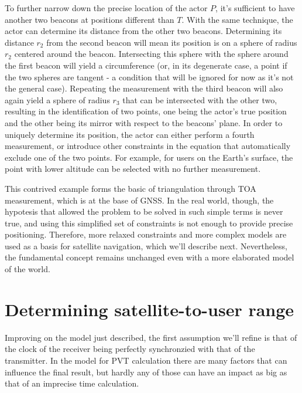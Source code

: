 To further narrow down the precise location of the actor $P$, it's sufficient to
have another two beacons at positions different than $T$. With the same
technique, the actor can determine its distance from the other two beacons.
Determining its distance $r_2$ from the second beacon will mean its position is
on a sphere of radius $r_2$ centered around the beacon. Intersecting this sphere
with the sphere around the first beacon will yield a circumference (or, in its
degenerate case, a point if the two spheres are tangent - a condition that will
be ignored for now as it's not the general case). Repeating the measurement with
the third beacon will also again yield a sphere of radius $r_3$ that can be
intersected with the other two, resulting in the identification of two points,
one being the actor's true position and the other being its mirror with respect
to the beacons' plane. In order to uniquely determine its position, the actor
can either perform a fourth measurement, or introduce other constraints in the
equation that automatically exclude one of the two points. For example, for
users on the Earth's surface, the point with lower altitude can be selected with
no further measurement.

\par

This contrived example forms the basic of triangulation through TOA measurement,
which is at the base of GNSS. In the real world, though, the hypotesis that
allowed the problem to be solved in such simple terms is never true, and using
this simplified set of constraints is not enough to provide precise positioning.
Therefore, more relaxed constraints and more complex models are used as a basis
for satellite navigation, which we'll describe next. Nevertheless, the
fundamental concept remains unchanged even with a more elaborated model of the
world.

\section{Determining satellite-to-user range}
Improving on the model just described, the first assumption we'll refine is that
of the clock of the receiver being perfectly synchronzied with that of the
transmitter. In the model for PVT calculation there are many factors that can
influence the final result, but hardly any of those can have an impact as big as
that of an imprecise time calculation.

\par

